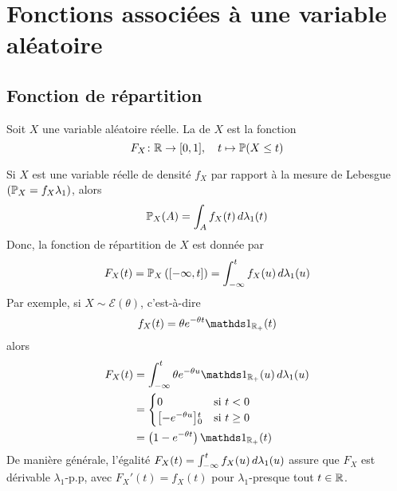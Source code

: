 \section{Fonctions associées à une variable aléatoire}

\subsection{Fonction de répartition}

\begin{definition}
    Soit \(X\) une variable aléatoire réelle. La  de \(X\)
    est la fonction
    \begin{equation*}
        F_X\colon \mathbb{R}\to\mathopen{}\left[0,1\right]\mathclose{},\quad t\mapsto \mathbb{P}(X\leq t)
    \end{equation*}
\end{definition}

\begin{example}
    Si \(X\) est une variable réelle de densité \(f_X\) par rapport à la mesure de Lebesgue
    \(\left(\mathbb{P}_X = f_X\lambda_1\right)\), alors
    \begin{equation*}
        \mathbb{P}_X(A) = \int_A f_X(t)\mathop{}\!{d}\lambda_1(t)
    \end{equation*}
    Donc, la fonction de répartition de \(X\) est donnée par
    \begin{equation*}
        F_X(t) = \mathbb{P}_X\left(\mathopen{}\left[-\infty,t\right]\mathclose{}\right) = \int_{-\infty}^t f_X(u)\mathop{}\!{d}\lambda_1(u)
    \end{equation*}
    Par exemple, si \(X\sim\mathcal E(\theta)\), c'est-à-dire
    \begin{equation*}
        f_X(t) = \theta e^{-\theta t}\one_{\R_+}(t)
    \end{equation*}
    alors
    \begin{equation*}
        \begin{aligned}
            F_X(t)
            &= \int_{-\infty}^t \theta e^{-\theta u}\one_{\R_+}(u)\der\lambda_1(u)\\
            &= \begin{cases}
                0 & \text{si } t<0\\
                \ff{-e^{-\theta u}}_0^t & \text{si } t\geq 0
            \end{cases}\\
            &= \left(1-e^{-\theta t}\right)\one_{\R_+}(t)
        \end{aligned}
    \end{equation*}
    De manière générale, l'égalité \(F_X(t) = \int_{-\infty}^t f_X(u)\mathop{}\!{d}\lambda_1(u)\) assure que
    \(F_X\) est dérivable \(\lambda_1\)-p.p, avec \(F_X'(t) = f_X(t)\) pour \(\lambda_1\)-presque tout \(t\in\mathbb{R}\).
\end{example}

